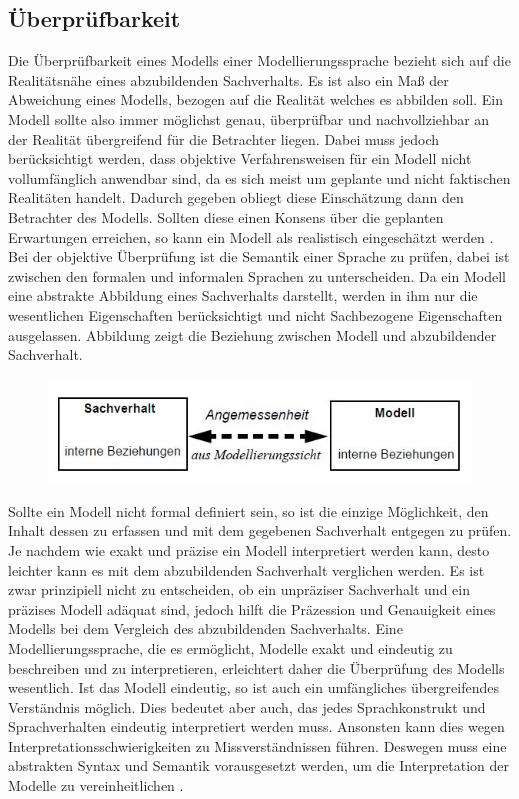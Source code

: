 \subsection{Überprüfbarkeit}
Die Überprüfbarkeit eines Modells einer Modellierungssprache bezieht sich auf die Realitätsnähe eines abzubildenden Sachverhalts. Es ist also ein Maß der Abweichung eines Modells, bezogen auf die Realität welches es abbilden soll.
Ein Modell sollte also immer möglichst genau, überprüfbar und nachvollziehbar an der Realität übergreifend für die Betrachter liegen. Dabei muss jedoch berücksichtigt werden, dass objektive Verfahrensweisen für ein Modell nicht vollumfänglich anwendbar sind, da es sich meist um geplante und nicht faktischen Realitäten handelt. Dadurch gegeben obliegt diese Einschätzung  dann den Betrachter des Modells. Sollten diese einen Konsens über die geplanten Erwartungen erreichen, so kann ein Modell als realistisch eingeschätzt werden \cite[3]{Becker_2012}. Bei der objektive Überprüfung ist die Semantik einer Sprache zu prüfen, dabei ist zwischen den formalen und informalen Sprachen zu unterscheiden. Da ein Modell eine abstrakte Abbildung eines Sachverhalts darstellt, werden in ihm nur die wesentlichen Eigenschaften berücksichtigt und nicht Sachbezogene Eigenschaften ausgelassen. Abbildung \pageref{fig:Beziehung} zeigt die Beziehung zwischen Modell und abzubildender Sachverhalt.
\begin{center}
	\begin{figure}[h]
		\includegraphics[scale=1]{Graphics/Sachverhalt.jpg}
		\label{fig:Beziehung}
	\end{figure}
\end{center}
Sollte ein Modell nicht formal definiert sein, so ist die einzige Möglichkeit, den Inhalt dessen zu erfassen und mit dem gegebenen Sachverhalt entgegen zu prüfen. Je nachdem wie exakt und präzise ein Modell interpretiert werden kann, desto leichter kann es mit dem abzubildenden Sachverhalt verglichen werden. Es ist zwar prinzipiell nicht zu entscheiden, ob ein unpräziser Sachverhalt und ein präzises Modell adäquat sind, jedoch hilft die Präzession und Genauigkeit eines Modells bei dem Vergleich des abzubildenden Sachverhalts. Eine Modellierungssprache, die es ermöglicht, Modelle exakt und eindeutig zu beschreiben
und zu interpretieren, erleichtert daher die Überprüfung des Modells wesentlich. Ist das Modell eindeutig, so ist auch ein umfängliches übergreifendes Verständnis möglich. Dies bedeutet aber auch, das jedes Sprachkonstrukt und Sprachverhalten eindeutig interpretiert werden muss. Ansonsten kann dies wegen Interpretationsschwierigkeiten zu Missverständnissen führen. Deswegen muss eine abstrakten Syntax und Semantik vorausgesetzt werden, um die Interpretation der Modelle zu vereinheitlichen \cite[35F]{Frank_1997}.
